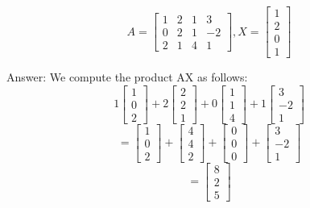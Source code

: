 \documentclass{article}
\begin{document}
\begin{description}[style=nextline]
\item[Question 3: Compute the product $AX$ for]
$$A = \left[ \begin{array}{rrrr} 1 & 2 & 1 & 3 \\ 0 & 2 & 1 & -2 \\ 2 & 1 & 4 & 1 \end{array} \right], X = \left[ \begin{array}{r} 1 \\ 2 \\ 0 \\ 1 \end{array} \right]$$

Answer: We compute the product AX as follows:
$$1 \left[ \begin{array}{r} 1 \\ 0 \\ 2 \end{array} \right] + 2 \left[ \begin{array}{r} 2 \\ 2 \\ 1 \end{array} \right] + 0\left[ \begin{array}{r} 1 \\ 1 \\ 4 \end{array} \right] + 1 \left[ \begin{array}{r} 3 \\ -2 \\ 1 \end{array} \right]$$
$$ = \left[ \begin{array}{r} 1 \\ 0 \\ 2 \end{array} \right] + \left[ \begin{array}{r} 4 \\ 4 \\ 2 \end{array} \right] + \left[ \begin{array}{r} 0 \\ 0 \\ 0 \end{array} \right] + \left[ \begin{array}{r} 3 \\ -2 \\ 1 \end{array} \right]$$
$$ = \left[ \begin{array}{r} 8 \\ 2 \\ 5 \end{array} \right]$$


\end{description}
\end{document}
